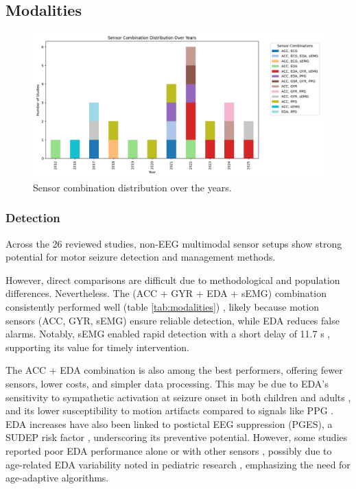 \subsection{Modalities}

\begin{figure}
    \centering
    \includegraphics[width=1\textwidth]{Discussion/figures/Sensor_Combination_Distribution_Over_the_Years.png}
    \caption{Sensor combination distribution over the years.}
    \label{fig:sensor_comb_over_years}
\end{figure}

\subsubsection{Detection}
Across the 26 reviewed studies, non-EEG multimodal sensor setups show strong potential for motor seizure detection and management methods.

However, direct comparisons are difficult due to methodological and population differences. Nevertheless. The (ACC + GYR + EDA + sEMG) combination consistently performed well (table \ref{tab:modalities}) , likely because motion sensors (ACC, GYR, sEMG) ensure reliable detection, while EDA reduces false alarms. Notably, sEMG enabled rapid detection with a short delay of 11.7 s  \cite{De_Cooman2018-pq}, supporting its value for timely intervention.

The ACC + EDA combination is also among the best performers, offering fewer sensors, lower costs, and simpler data processing. This may be due to EDA’s sensitivity to sympathetic activation at seizure onset in both children and adults \cite{Casanovas_Ortega2022-yx}, and its lower susceptibility to motion artifacts compared to signals like PPG  \cite{Ismail2021-fs}. EDA increases have also been linked to postictal EEG suppression (PGES), a SUDEP risk factor \cite{Barot2019-nx,Regalia2019-ch}, underscoring its preventive potential. However, some studies reported poor EDA performance alone or with other sensors \cite{Yu2023-ss,Tang2021-td}, possibly due to age-related EDA variability noted in pediatric research \cite{Ge2023-ab}, emphasizing the need for age-adaptive algorithms.

